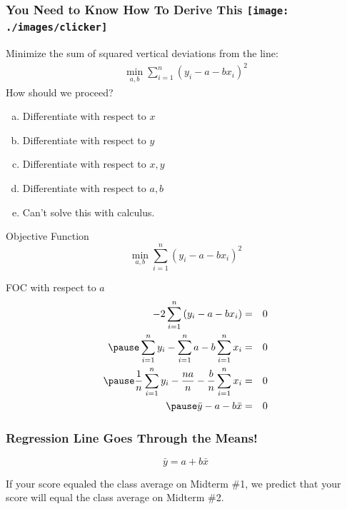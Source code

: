 \begin{frame}
\frametitle{You Need to Know How To Derive This \hfill \texttt{[image: ./images/clicker]}}
\alert{Minimize the sum of squared vertical deviations from the line:}
\begin{eqnarray*}
\min_{a,b}  \sum_{i=1}^n (y_i - a - b x_i)^2
\end{eqnarray*}
How should we proceed?
\begin{enumerate}[(a)]
	\item Differentiate with respect to $x$
	\item Differentiate with respect to $y$
	\item Differentiate with respect to $x,y$
	\item Differentiate with respect to $a,b$
	\item Can't solve this with calculus.
\end{enumerate}
\end{frame}
\begin{frame}
\begin{block}{Objective Function}
$$\displaystyle \min_{a,b}  \sum_{i=1}^n (y_i - a - b x_i)^2$$
\end{block}
\begin{block}{FOC with respect to $a$}\pause
\begin{eqnarray*}
	-2 \sum_{i=1}^n\left(y_i - a -bx_i\right) &=& 0 \\\pause
	\sum_{i=1}^n y_i - \sum_{i=1}^n a - b\sum_{i=1}^n x_i &=& 0 \\\pause
	\frac{1}{n} \sum_{i=1}^n y_i - \frac{na}{n} -  \frac{b}{n} \sum_{i=1}^n x_i &=& 0\\\pause
	\bar{y} - a - b\bar{x} &=& 0
\end{eqnarray*}
\end{block}
\end{frame}
\begin{frame}

\frametitle{Regression Line Goes Through the Means!}
 \Huge
\begin{equation*}\boxed{\bar{y} = a + b\bar{x}}\end{equation*}
\normalsize

\vspace{1em}

\alert{If your score equaled the class average on Midterm \#1, we predict that your score will equal the class average on Midterm \#2.}
\end{frame}
